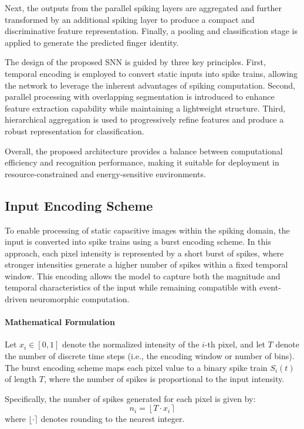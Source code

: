 \documentclass[../main.tex]{subfiles}
\begin{document}
Next, the outputs from the parallel spiking layers are aggregated and further transformed by an additional spiking layer to produce a compact and discriminative feature representation. Finally, a pooling and classification stage is applied to generate the predicted finger identity.

The design of the proposed SNN is guided by three key principles. First, temporal encoding is employed to convert static inputs into spike trains, allowing the network to leverage the inherent advantages of spiking computation. Second, parallel processing with overlapping segmentation is introduced to enhance feature extraction capability while maintaining a lightweight structure. Third, hierarchical aggregation is used to progressively refine features and produce a robust representation for classification.

Overall, the proposed architecture provides a balance between computational efficiency and recognition performance, making it suitable for deployment in resource-constrained and energy-sensitive environments.

\subsection{Input Encoding Scheme}

To enable processing of static capacitive images within the spiking domain, the input is converted into spike trains using a burst encoding scheme. In this approach, each pixel intensity is represented by a short burst of spikes, where stronger intensities generate a higher number of spikes within a fixed temporal window. This encoding allows the model to capture both the magnitude and temporal characteristics of the input while remaining compatible with event-driven neuromorphic computation.
\paragraph{Mathematical Formulation}

Let $x_i \in [0,1]$ denote the normalized intensity of the $i$-th pixel, and let $T$ denote the number of discrete time steps (i.e., the encoding window or number of bins). The burst encoding scheme maps each pixel value to a binary spike train $S_i(t)$ of length $T$, where the number of spikes is proportional to the input intensity.

Specifically, the number of spikes generated for each pixel is given by:
\[
n_i = \left\lfloor T \cdot x_i \right\rceil
\]
where $\lfloor \cdot \rceil$ denotes rounding to the nearest integer.
\end{document}
